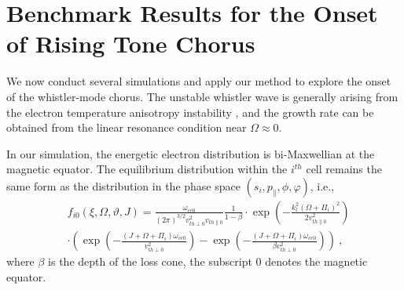 \section{Benchmark Results for the Onset of Rising Tone Chorus}
\label{sec:code}
We now conduct several simulations and apply our method to explore the onset of the whistler-mode chorus.
The unstable whistler wave is generally arising from the electron temperature anisotropy instability \cite{kennel1966a,kennel1966b}, and the growth rate can be obtained from the linear resonance condition near $\Omega \approx 0$.

In our simulation, the energetic electron distribution is bi-Maxwellian at the magnetic equator. 
The equilibrium distribution within the $i^{th}$ cell remains the same form as the distribution in the phase space $(s_i, p_\|, \phi, \varphi)$, i.e.,
\begin{equation}
    \begin{aligned}
        & f_{i 0}(\xi, \Omega, \vartheta, J) =\frac{\omega_{c e 0}}{(2 \pi)^{3 / 2} v_{t h \perp 0}^2 v_{t h \| 0}} \frac{1}{1-\beta} \cdot \exp \left(-\frac{k_l^2(\Omega+\Pi_i)^2}{2 v_{t h \| 0}^2}\right) \\
        &\cdot\left(\exp \left(-\frac{(J+\Omega+\Pi_i) \omega_{c e 0}}{v_{t h \perp 0}^2}\right)-\exp \left(-\frac{(J+\Omega+\Pi_i) \omega_{c e 0}}{\beta v_{t h \perp 0}^2}\right)\right)~,
        \end{aligned}
\end{equation}
where $\beta$ is the depth of the loss cone, the subscript $0$ denotes the magnetic equator.


